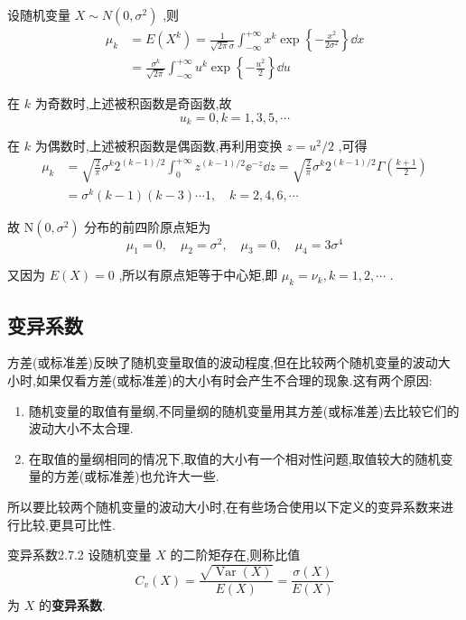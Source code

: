 \begin{example}\label{exam:2.7.1}
	设随机变量 $ X \sim N\left(0, \sigma^{2}\right) $ ,则
	\[
	\begin{aligned} 
	\mu_{k} &=E\left(X^{k}\right)=\frac{1}{\sqrt{2 \pi} \sigma} \int_{-\infty}^{+\infty} x^{k} \exp \left\{-\frac{x^{2}}{2 \sigma^{2}}\right\} \dd x \\ 
	&=\frac{\sigma^{k}}{\sqrt{2 \pi}} \int_{-\infty}^{+\infty} u^{k} \exp \left\{-\frac{u^{2}}{2}\right\} \dd u 
	\end{aligned}
	\]
	
	在 $ k $ 为奇数时,上述被积函数是奇函数,故
	\[
	u_{k}=0, k=1,3,5, \cdots
	\]
	
	在 $ k $ 为偶数时,上述被积函数是偶函数,再利用变换 $ z=u^{2} / 2 $ ,可得
	\[
	\begin{aligned} \mu_{k} &=\sqrt{\frac{2}{\pi}} \sigma^{k} 2^{(k-1) / 2} \int_{0}^{+\infty} z^{(k-1) / 2} \ee ^{-z} \dd z=\sqrt{\frac{2}{\pi}} \sigma^{k} 2^{(k-1) / 2} \Gamma\left(\frac{k+1}{2}\right) \\ &=\sigma^{k}(k-1)(k-3) \cdots 1, \quad k=2,4,6, \cdots \end{aligned}
	\]
	
	故 $ \mathrm{N}\left(0, \sigma^{2}\right) $ 分布的前四阶原点矩为
	\[
	\mu_{1}=0, \quad \mu_{2}=\sigma^{2}, \quad \mu_{3}=0, \quad \mu_{4}=3 \sigma^{4}
	\]
	
	又因为 $ E(X)=0 $ ,所以有原点矩等于中心矩,即 $ \mu_{k}=\nu_{k}, k=1,2, \cdots $ .
\end{example}

\subsection{变异系数}\label{ssec:2.7.2}

方差(或标准差)反映了随机变量取值的波动程度,但在比较两个随机变量的波动大小时,如果仅看方差(或标准差)的大小有时会产生不合理的现象.这有两个原因:

\begin{enumerate}
	\item 随机变量的取值有量纲,不同量纲的随机变量用其方差(或标准差)去比较它们的波动大小不太合理.
	\item 在取值的量纲相同的情况下,取值的大小有一个相对性问题,取值较大的随机变量的方差(或标准差)也允许大一些.
\end{enumerate}

所以要比较两个随机变量的波动大小时,在有些场合使用以下定义的变异系数来进行比较,更具可比性.

\begin{definition}{变异系数}{2.7.2}
	设随机变量 $ X $ 的二阶矩存在,则称比值
	\begin{equation}
	C_{v}(X)=\frac{\sqrt{\operatorname{Var}(X)}}{E(X)}=\frac{\sigma(X)}{E(X)} \label{eq:2.7.3}
	\end{equation}
	为 $ X $ 的\textbf{变异系数}.
\end{definition}


